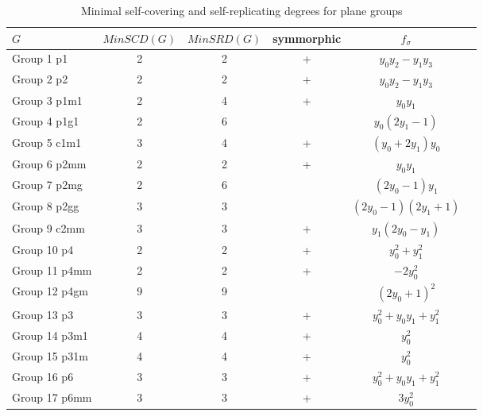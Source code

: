 \begin{table}[H]
\begin{footnotesize}
\centering
\begin{tabular}{|l|c|c|c|c|c|}
\hline
  $G$            & $MinSCD(G)$ & $MinSRD(G)$ & symmorphic & $f_\sigma$  \\
\hline
  Group 1 p1     &    2   &     2    &    +    & $y_0y_2 - y_1 y_3$ \\
  Group 2 p2     &    2   &     2    &    +    & $y_0y_2 - y_1 y_3$ \\
  Group 3 p1m1   &    2   &     4    &    +    & $y_0y_1$ \\
  Group 4 p1g1   &    2   &     6    &         & $y_0(2y_1 - 1)$ \\
  Group 5 c1m1   &    3   &     4    &    +    & $\left(y_{0} + 2y_{1}\right)y_{0}$ \\
  Group 6 p2mm   &    2   &     2    &    +    & $y_0y_1$ \\
  Group 7 p2mg   &    2   &     6    &         & $(2y_0 - 1)y_1$ \\
  Group 8 p2gg   &    3   &     3    &         & $(2y_0 - 1)(2y_1 + 1)$ \\
  Group 9 c2mm   &    3   &     3    &    +    & $y_{1}(2y_{0} - y_{1})$ \\
  Group 10 p4    &    2   &     2    &    +    & $y_0^2 + y_1^2$ \\
  Group 11 p4mm  &    2   &     2    &    +    & $-2y_0^2$ \\
  Group 12 p4gm  &    9   &     9    &         & $(2y_0 + 1)^2$ \\
  Group 13 p3    &    3   &     3    &    +    & $y_0^2 + y_0y_1 + y_1^2$ \\
  Group 14 p3m1  &    4   &     4    &    +    & $y_0^2$ \\
  Group 15 p31m  &    4   &     4    &    +    & $y_0^2$ \\
  Group 16 p6    &    3   &     3    &    +    & $y_0^2 + y_0y_1 + y_1^2$ \\
  Group 17 p6mm  &    3   &     3    &    +    & $3 y_0^2$ \\
\hline
\end{tabular}
\caption{Minimal self-covering and self-replicating degrees for plane groups}
\label{tab:min_srdegrees}
\end{footnotesize}
\end{table}

